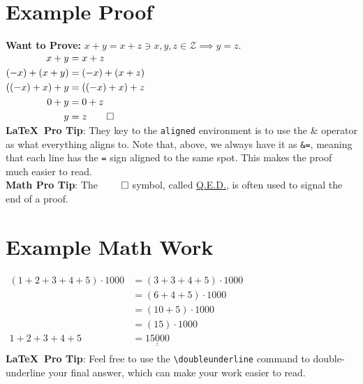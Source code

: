 \documentclass[letter]{amsart}
\def\doubleunderline#1{\underline{\underline{#1}}}
\begin{document}
\section*{Example Proof}
\noindent\textbf{Want to Prove:} $x+y=x+z \ni x,y,z \in \mathcal{Z} \implies y=z$.\vspace{0.5em}\\
$\begin{aligned}
x+y &= x + z\\
(-x)+(x+y) &= (-x)+(x+z)\\
((-x)+x)+y&=((-x)+x)+z\\
0+y &= 0+z\\
y &= z \qed
\end{aligned}$
\text{ }\vspace{2em}\\
\textbf{\LaTeX\ Pro Tip}: They key to the \texttt{aligned} environment is to use the \& operator as what everything aligns to.  Note that, above, we always have it as \texttt{\&=}, meaning that each line has the \texttt{=} sign aligned to the same spot.  This makes the proof much easier to read.\vspace{1em}\\
\textbf{Math Pro Tip}: The $\qed$ symbol, called \href{https://en.wikipedia.org/wiki/Q.E.D.}{Q.E.D.}, is often used to signal the end of a proof.
\newpage

\section*{Example Math Work}
$\begin{aligned}
(1 + 2 + 3 + 4 + 5) \cdot 1000 &= (3+3+4+5) \cdot 1000\\
&= (6+4+5) \cdot 1000\\
&= (10+5) \cdot 1000\\
&= (15) \cdot 1000\\
1 + 2 + 3 + 4 + 5 &= \doubleunderline{15000}\\
\end{aligned}$
\text{ }\vspace{2em}\\
\textbf{\LaTeX\ Pro Tip}: Feel free to use the \verb!\doubleunderline! command to double-underline your final answer, which can make your work easier to read.
\newpage
\end{document}
